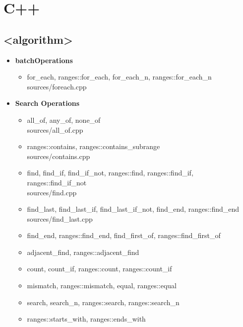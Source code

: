 \documentclass{article}
\begin{document}
\section{C++}
    \subsection{<algorithm>}
      \begin{itemize}
        \item \textbf{batchOperations}
          \begin{itemize}
            \item for\_each, ranges::for\_each, for\_each\_n, ranges::for\_each\_n \\
               {sources/foreach.cpp}
          \end{itemize}
        \item \textbf{Search Operations}
          \begin{itemize}
            \item all\_of, any\_of, none\_of \\
               {sources/all_of.cpp}
            \item ranges::contains, ranges::contains\_subrange \\
               {sources/contains.cpp}
            \item find, find\_if, find\_if\_not, ranges::find, ranges::find\_if, ranges::find\_if\_not \\
               {sources/find.cpp}
            \item find\_last, find\_last\_if, find\_last\_if\_not, find\_end, ranges::find\_end \\
               {sources/find_last.cpp}
            \item find\_end, ranges::find\_end, find\_first\_of, ranges::find\_first\_of
            \item adjacent\_find, ranges::adjacent\_find
            \item count, count\_if, ranges::count, ranges::count\_if
            \item mismatch, ranges::mismatch, equal, ranges::equal
            \item search, search\_n, ranges::search, ranges::search\_n
            \item ranges::starts\_with, ranges::ends\_with
          \end{itemize}

\end{itemize}
\end{document}
